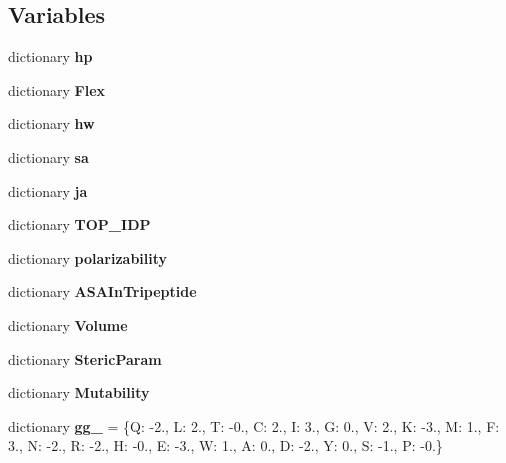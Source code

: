 \subsection*{Variables}
\begin{DoxyCompactItemize}
\item 
dictionary {\bfseries hp}
\item 
dictionary {\bfseries Flex}
\item 
dictionary {\bfseries hw}
\item 
dictionary {\bfseries sa}
\item 
dictionary {\bfseries ja}
\item 
dictionary {\bfseries T\+O\+P\+\_\+\+I\+D\+P}
\item 
dictionary {\bfseries polarizability}
\item 
dictionary {\bfseries A\+S\+A\+In\+Tripeptide}
\item 
dictionary {\bfseries Volume}
\item 
dictionary {\bfseries Steric\+Param}
\item 
dictionary {\bfseries Mutability}
\item 
\hypertarget{namespacefeat__extract_1_1_a_a_scales_a03ca06dddcf4f7e9fb6a1ba00b345590}{}dictionary {\bfseries gg\+\_} = \{\textquotesingle{}Q\textquotesingle{}\+: -\/2., \textquotesingle{}L\textquotesingle{}\+: 2., \textquotesingle{}T\textquotesingle{}\+: -\/0., \textquotesingle{}C\textquotesingle{}\+: 2., \textquotesingle{}I\textquotesingle{}\+: 3., \textquotesingle{}G\textquotesingle{}\+: 0., \textquotesingle{}V\textquotesingle{}\+: 2., \textquotesingle{}K\textquotesingle{}\+: -\/3., \textquotesingle{}M\textquotesingle{}\+: 1., \textquotesingle{}F\textquotesingle{}\+: 3., \textquotesingle{}N\textquotesingle{}\+: -\/2., \textquotesingle{}R\textquotesingle{}\+: -\/2., \textquotesingle{}H\textquotesingle{}\+: -\/0., \textquotesingle{}E\textquotesingle{}\+: -\/3., \textquotesingle{}W\textquotesingle{}\+: 1., \textquotesingle{}A\textquotesingle{}\+: 0., \textquotesingle{}D\textquotesingle{}\+: -\/2., \textquotesingle{}Y\textquotesingle{}\+: 0., \textquotesingle{}S\textquotesingle{}\+: -\/1., \textquotesingle{}P\textquotesingle{}\+: -\/0.\}\label{namespacefeat__extract_1_1_a_a_scales_a03ca06dddcf4f7e9fb6a1ba00b345590}


\end{DoxyCompactItemize}
